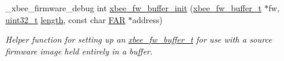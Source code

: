 \begin{DoxyCompactItemize}
\+\_\+xbee\+\_\+firmware\+\_\+debug int \hyperlink{group__xbee__firmware_ga8ac2a394778a985657db3c7f08b12692}{xbee\+\_\+fw\+\_\+buffer\+\_\+init} (\hyperlink{structxbee__fw__buffer__t}{xbee\+\_\+fw\+\_\+buffer\+\_\+t} $\ast$fw, \hyperlink{group__hal__dos_ga09a1e304d66d35dd47daffee9731edaa}{uint32\+\_\+t} \hyperlink{group__zdo_gab2b3adeb2a67e656ff030b56727fd0ac}{length}, const char \hyperlink{group__hal_gaef060b3456fdcc093a7210a762d5f2ed}{F\+AR} $\ast$address)
\begin{DoxyCompactList}\small\item\em Helper function for setting up an \hyperlink{structxbee__fw__buffer__t}{xbee\+\_\+fw\+\_\+buffer\+\_\+t} for use with a source firmware image held entirely in a buffer. \end{DoxyCompactList}\end{DoxyCompactItemize}
